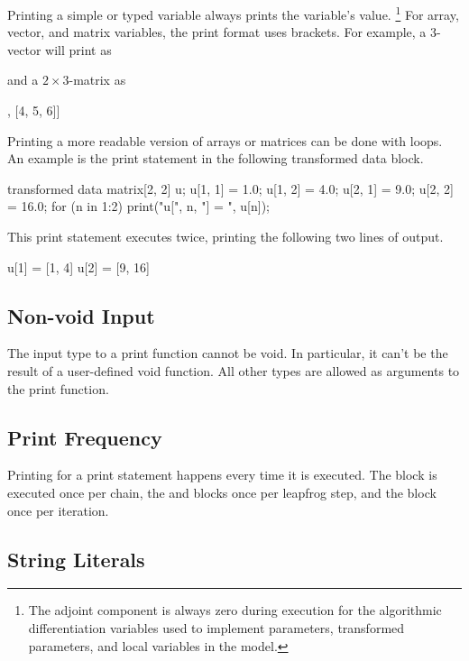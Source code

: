 Printing a simple  or  typed variable always
prints the variable's value.%
%
\footnote{The adjoint component is always zero during execution for
  the algorithmic differentiation variables used to implement
  parameters, transformed parameters, and local variables in the model.}
%
For array, vector, and matrix variables, the print format uses
brackets.  For example, a 3-vector will print as
%
\begin{stancode}
[1, 2, 3]
\end{stancode}
%
and a $2 \times 3$-matrix as
%
\begin{stancode}
[[1, 2, 3], [4, 5, 6]]
\end{stancode}
%

Printing a more readable version of arrays or matrices can be done
with loops.  An example is the print statement in the following
transformed data block.
%
\begin{stancode}
transformed data {
  matrix[2, 2] u;
  u[1, 1] = 1.0;   u[1, 2] = 4.0;
  u[2, 1] = 9.0;   u[2, 2] = 16.0;
  for (n in 1:2)
    print("u[", n, "] = ", u[n]);
}
\end{stancode}
%
This print statement executes twice, printing the following two lines
of output.
%
\begin{stancode}
u[1] = [1, 4]
u[2] = [9, 16]
\end{stancode}

\subsection{Non-void Input}

The input type to a print function cannot be void.  In particular, it
can't be the result of a user-defined void function.  All other types
are allowed as arguments to the print function.

\subsection{Print Frequency}

Printing for a print statement happens every time it is executed.  The
 block is executed once per chain, the
 and  blocks once per leapfrog
step, and the  block once per iteration.

\subsection{String Literals}

